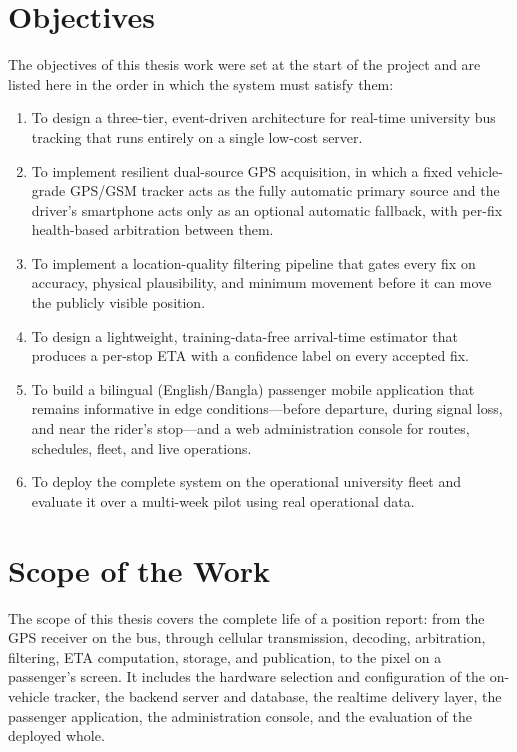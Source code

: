 \section{Objectives}
The objectives of this thesis work were set at the start of the project
and are listed here in the order in which the system must satisfy them:

\begin{enumerate}
  \item To design a three-tier, event-driven architecture for real-time
  university bus tracking that runs entirely on a single low-cost server.
  \item To implement resilient dual-source GPS acquisition, in which a
  fixed vehicle-grade GPS/GSM tracker acts as the fully automatic primary
  source and the driver's smartphone acts only as an optional automatic
  fallback, with per-fix health-based arbitration between them.
  \item To implement a location-quality filtering pipeline that gates
  every fix on accuracy, physical plausibility, and minimum movement
  before it can move the publicly visible position.
  \item To design a lightweight, training-data-free arrival-time estimator
  that produces a per-stop ETA with a confidence label on every accepted
  fix.
  \item To build a bilingual (English/Bangla) passenger mobile application
  that remains informative in edge conditions---before departure, during
  signal loss, and near the rider's stop---and a web administration
  console for routes, schedules, fleet, and live operations.
  \item To deploy the complete system on the operational university fleet
  and evaluate it over a multi-week pilot using real operational data.
\end{enumerate}

\section{Scope of the Work}
The scope of this thesis covers the complete life of a position report:
from the GPS receiver on the bus, through cellular transmission, decoding,
arbitration, filtering, ETA computation, storage, and publication, to the
pixel on a passenger's screen. It includes the hardware selection and
configuration of the on-vehicle tracker, the backend server and database,
the realtime delivery layer, the passenger application, the administration
console, and the evaluation of the deployed whole.

